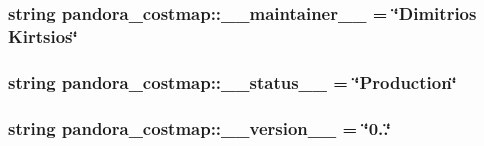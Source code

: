 \hypertarget{namespacepandora__costmap_afdc7dbab2be0029fcec6c7bc4ad2c3ca}{
\subsubsection[{\-\_\-\-\_\-maintainer\-\_\-\-\_\-}]{\setlength{\rightskip}{0pt plus 5cm}string {\bf pandora\-\_\-costmap\-::\-\_\-\-\_\-maintainer\-\_\-\-\_\-} = \char`\"{}\-Dimitrios \-Kirtsios\char`\"{}}}\label{namespacepandora__costmap_afdc7dbab2be0029fcec6c7bc4ad2c3ca}
\hypertarget{namespacepandora__costmap_a3f743a72f407ca7f4e85bc69da44f99d}{
\subsubsection[{\-\_\-\-\_\-status\-\_\-\-\_\-}]{\setlength{\rightskip}{0pt plus 5cm}string {\bf pandora\-\_\-costmap\-::\-\_\-\-\_\-status\-\_\-\-\_\-} = \char`\"{}\-Production\char`\"{}}}\label{namespacepandora__costmap_a3f743a72f407ca7f4e85bc69da44f99d}
\hypertarget{namespacepandora__costmap_ab656017f795670d90fbe4494172f1ee6}{
\subsubsection[{\-\_\-\-\_\-version\-\_\-\-\_\-}]{\setlength{\rightskip}{0pt plus 5cm}string {\bf pandora\-\_\-costmap\-::\-\_\-\-\_\-version\-\_\-\-\_\-} = \char`\"{}0..\char`\"{}}}\label{namespacepandora__costmap_ab656017f795670d90fbe4494172f1ee6}

